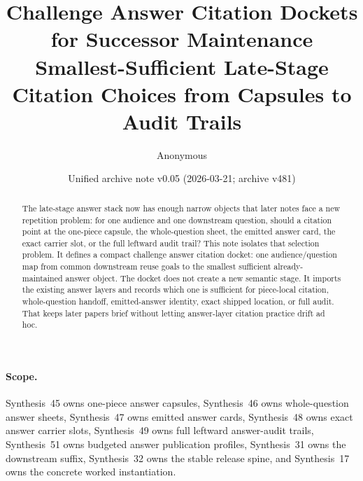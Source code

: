 \documentclass[11pt]{article}
\title{Challenge Answer Citation Dockets for Successor Maintenance\\\large Smallest-Sufficient Late-Stage Citation Choices from Capsules to Audit Trails}
\author{Anonymous}
\date{Unified archive note v0.05 (2026-03-21; archive v481)}
\begin{document}
\maketitle

\begin{abstract}
The late-stage answer stack now has enough narrow objects that later notes face a new repetition problem: for one audience and one downstream question, should a citation point at the one-piece capsule, the whole-question sheet, the emitted answer card, the exact carrier slot, or the full leftward audit trail? This note isolates that selection problem. It defines a compact challenge answer citation docket: one audience/question map from common downstream reuse goals to the smallest sufficient already-maintained answer object. The docket does not create a new semantic stage. It imports the existing answer layers and records which one is sufficient for piece-local citation, whole-question handoff, emitted-answer identity, exact shipped location, or full audit. That keeps later papers brief without letting answer-layer citation practice drift ad hoc.
\end{abstract}

\paragraph{Scope.}
Synthesis~45 owns one-piece answer capsules, Synthesis~46 owns whole-question answer sheets, Synthesis~47 owns emitted answer cards, Synthesis~48 owns exact answer carrier slots, Synthesis~49 owns full leftward answer-audit trails, Synthesis~51 owns budgeted answer publication profiles, Synthesis~31 owns the downstream suffix, Synthesis~32 owns the stable release spine, and Synthesis~17 owns the concrete worked instantiation.\cite{series:challengeanswercapsules,series:challengeanswersheets,series:challengeanswercards,series:challengeanswercarrierslots,series:challengeansweraudittrails,series:challengeanswerpublicationprofiles,series:downstreamnormalforms,series:releasespine,series:workedexample}
\end{document}
